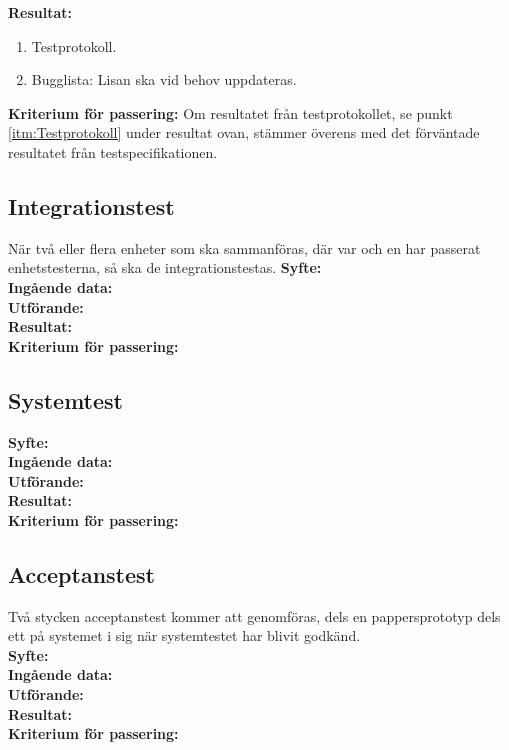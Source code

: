 \documentclass[a4paper,10pt]{article}
\begin{document}
    \textbf{Resultat:}
        \begin{enumerate}
            \item \label{tim:Testprotokoll} Testprotokoll.
            \item Bugglista: Lisan ska vid behov uppdateras.
        \end{enumerate}
    \textbf{Kriterium för passering:} Om resultatet från testprotokollet, se punkt \ref{itm:Testprotokoll} under resultat ovan, stämmer överens med det förväntade resultatet från testspecifikationen.

\subsection{Integrationstest}
När två eller flera enheter som ska sammanföras, där var och en har passerat enhetstesterna, så ska de integrationstestas.
   \textbf{Syfte:}
    \\ \textbf{Ingående data:}
    \\ \textbf{Utförande:}
    \\ \textbf{Resultat:}
    \\ \textbf{Kriterium för passering:}
\subsection{Systemtest}
   \textbf{Syfte:}
    \\ \textbf{Ingående data:}
    \\ \textbf{Utförande:}
    \\ \textbf{Resultat:}
    \\ \textbf{Kriterium för passering:}
\subsection{Acceptanstest}
Två stycken acceptanstest kommer att genomföras, dels en pappersprototyp dels ett på systemet i sig när systemtestet har blivit godkänd.
    \\ \textbf{Syfte:}
    \\ \textbf{Ingående data:}
    \\ \textbf{Utförande:}
    \\ \textbf{Resultat:}
    \\ \textbf{Kriterium för passering:}
\end{document}
